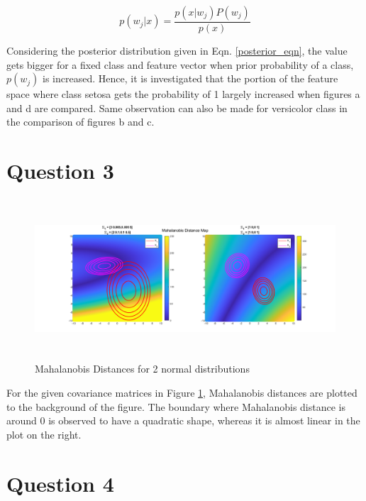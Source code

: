\documentclass[11pt]{extarticle}
\begin{document}
\begin{equation}
    p(w_j|x) = \frac{p(x|w_j)P(w_j)}{p(x)}
    \label{posterior_eqn}
\end{equation}

Considering the posterior distribution given in Eqn. \ref{posterior_eqn}, the value gets bigger for a fixed class and feature vector
when prior probability of a class, $p(w_j)$ is increased. Hence, it is investigated that the portion of the feature space where class
setosa gets the probability of 1 largely increased when figures a and d are compared. Same observation can also be made for 
versicolor class in the comparison of figures b and c.

\pagebreak 

\section*{Question 3}

{\centering
    \begin{figure}[h]
        \includegraphics[width=16cm, height=6cm]{mahal.png}
        \caption{Mahalanobis Distances for 2 normal distributions}
        \label{fig:q3figure}
    \end{figure}
}

For the given covariance matrices in Figure \ref{fig:q3figure}, Mahalanobis distances are plotted to the
background of the figure. The boundary where Mahalanobis distance is around 0 is observed to have a 
quadratic shape, whereas it is almost linear in the plot on the right. 

\section*{Question 4}
\end{document}
